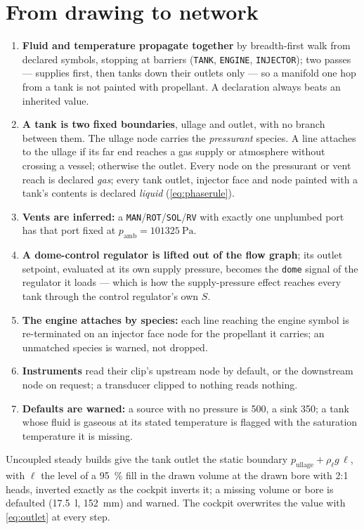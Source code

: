 \documentclass[11pt,a4paper]{article}
\newcommand{\code}[1]{\texttt{#1}}
\begin{document}
\section{From drawing to network}\label{sec:pid}
\begin{enumerate}[label=(D\arabic*)]
\item \textbf{Fluid and temperature propagate together} by breadth-first walk
      from declared symbols, stopping at barriers (\code{TANK}, \code{ENGINE},
      \code{INJECTOR}); two passes --- supplies first, then tanks down their
      outlets only --- so a manifold one hop from a tank is not painted with
      propellant. A declaration always beats an inherited value.
\item \textbf{A tank is two fixed boundaries}, ullage and outlet, with no
      branch between them. The ullage node carries the \emph{pressurant}
      species. A line attaches to the ullage if its far end reaches a gas
      supply or atmosphere without crossing a vessel; otherwise the outlet.
      Every node on the pressurant or vent reach is declared \emph{gas};
      every tank outlet, injector face and node painted with a tank's contents
      is declared \emph{liquid} (\cref{eq:phaserule}).
\item \textbf{Vents are inferred:} a \code{MAN}/\code{ROT}/\code{SOL}/\code{RV}
      with exactly one unplumbed port has that port fixed at
      $p_{\mathrm{amb}}=\SI{101325}{\pascal}$.
\item \textbf{A dome-control regulator is lifted out of the flow graph}; its
      outlet setpoint, evaluated at its own supply pressure, becomes the
      \code{dome} signal of the regulator it loads --- which is how the
      supply-pressure effect reaches every tank through the control regulator's
      own $S$.
\item \textbf{The engine attaches by species:} each line reaching the engine
      symbol is re-terminated on an injector face node for the propellant it
      carries; an unmatched species is warned, not dropped.
\item \textbf{Instruments} read their clip's upstream node by default, or the
      downstream node on request; a transducer clipped to nothing reads nothing.
\item \textbf{Defaults are warned:} a source with no pressure is \SI{500}{\psi},
      a sink \SI{350}{\psi}; a tank whose fluid is gaseous at its stated
      temperature is flagged with the saturation temperature it is missing.
\end{enumerate}
Uncoupled steady builds give the tank outlet the static boundary
$p_{\mathrm{ullage}} + \rho_\ell g\,\ell$, with $\ell$ the level of a
\SI{95}{\percent} fill in the drawn volume at the drawn bore with 2:1 heads,
inverted exactly as the cockpit inverts it; a missing volume or bore is
defaulted (\SI{17.5}{\litre}, \SI{152}{\milli\metre}) and warned. The cockpit
overwrites the value with \cref{eq:outlet} at every step.
\end{document}
